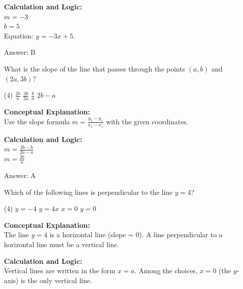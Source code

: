 \documentclass[11pt,paper=a4,answers]{exam}
\begin{document}
\begin{questions}
\begin{solution}
\vspace{10pt}
\textbf{Calculation and Logic:} \\
$m = -3$ \\
$b = 5$ \\
Equation: $y = -3x + 5$.

\vspace{15pt}
Answer: \colorbox{yellow!100}{B}
\end{solution}

\vspace{20pt}

\question
What is the slope of the line that passes through the points $(a, b)$ and $(2a, 3b)$?
\begin{tasks}(4)
    \task $\frac{2b}{a}$
    \task $\frac{3b}{2a}$
    \task $\frac{b}{a}$
    \task $2b - a$
\end{tasks}

\begin{solution}
\textbf{Conceptual Explanation:} \\
Use the slope formula $m = \frac{y_2 - y_1}{x_2 - x_1}$ with the given coordinates.

\vspace{10pt}
\textbf{Calculation and Logic:} \\
$m = \frac{3b - b}{2a - a}$ \\
$m = \frac{2b}{a}$

\vspace{15pt}
Answer: \colorbox{yellow!100}{A}
\end{solution}


\question
Which of the following lines is perpendicular to the line $y = 4$?
\begin{tasks}(4)
    \task $y = -4$
    \task $y = 4x$
    \task $x = 0$
    \task $y = 0$
\end{tasks}

\begin{solution}
\textbf{Conceptual Explanation:} \\
The line $y = 4$ is a horizontal line (slope = 0). A line perpendicular to a horizontal line must be a vertical line.

\vspace{10pt}
\textbf{Calculation and Logic:} \\
Vertical lines are written in the form $x = a$. Among the choices, $x = 0$ (the $y$-axis) is the only vertical line.


\end{solution}
\end{questions}
\end{document}
